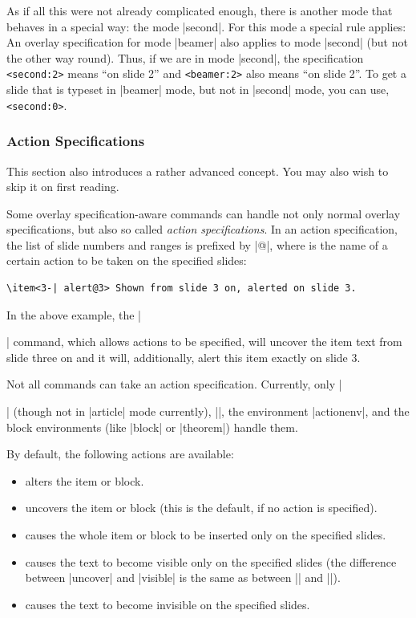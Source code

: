 \begin{original...}
As if all this were not already complicated enough, there is another mode that behaves in a special way: the mode |second|. For this mode a special rule applies: An overlay specification for mode |beamer| also applies to mode |second| (but not the other way round). Thus, if we are in mode |second|, the specification \Verb|<second:2>| means ``on slide 2'' and \Verb|<beamer:2>| also means ``on slide 2''. To get a slide that is typeset in |beamer| mode, but not in |second| mode, you can use, \Verb|<second:0>|.

\subsubsection{Action Specifications}
\label{section-action-specifications}

This section also introduces a rather advanced concept. You may also wish to skip it on first reading.

Some overlay specification-aware commands can handle not only normal overlay specifications, but also so called \emph{action specifications}. In an action specification, the list of slide numbers and ranges is prefixed by |@|, where  is the name of a certain action to be taken on the specified slides:
\begin{verbatim}
\item<3-| alert@3> Shown from slide 3 on, alerted on slide 3.
\end{verbatim}

In the above example, the |\item| command, which allows actions to be specified, will uncover the item text from slide three on and it will, additionally, alert this item exactly on slide 3.

Not all commands can take an action specification. Currently, only |\item| (though not in |article| mode currently), |\action|, the environment |actionenv|, and the block environments (like |block| or |theorem|) handle them.

By default, the following actions are available:
\begin{itemize}
\item {} alters the item or block.
\item {} uncovers the item or block (this is the default, if no action is specified).
\item {} causes the whole item or block to be inserted only on the specified slides.
\item {} causes the text to become visible only on the specified slides (the difference between |uncover| and |visible| is the same as between |\uncover| and |\visible|).
\item {} causes the text to become invisible on the specified slides.
\end{itemize}


\end{original...}
